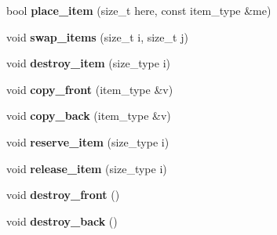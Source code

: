\begin{DoxyCompactItemize}
\item 
\hypertarget{classinternal_1_1item__buffer_a359f7e1708916af78e02bd3635dc5c6f}{}bool {\bfseries place\+\_\+item} (size\+\_\+t here, const item\+\_\+type \&me)\label{classinternal_1_1item__buffer_a359f7e1708916af78e02bd3635dc5c6f}

\item 
\hypertarget{classinternal_1_1item__buffer_ac4751d48bf1868349deda3a1de49ecba}{}void {\bfseries swap\+\_\+items} (size\+\_\+t i, size\+\_\+t j)\label{classinternal_1_1item__buffer_ac4751d48bf1868349deda3a1de49ecba}

\item 
\hypertarget{classinternal_1_1item__buffer_a170724771a4e56ad676d86439a916a3e}{}void {\bfseries destroy\+\_\+item} (size\+\_\+type i)\label{classinternal_1_1item__buffer_a170724771a4e56ad676d86439a916a3e}

\item 
\hypertarget{classinternal_1_1item__buffer_a08de719fb76466be302f42d07dcf2d28}{}void {\bfseries copy\+\_\+front} (item\+\_\+type \&v)\label{classinternal_1_1item__buffer_a08de719fb76466be302f42d07dcf2d28}

\item 
\hypertarget{classinternal_1_1item__buffer_a90f677f036f3eaa2324bc0b07ba804a1}{}void {\bfseries copy\+\_\+back} (item\+\_\+type \&v)\label{classinternal_1_1item__buffer_a90f677f036f3eaa2324bc0b07ba804a1}

\item 
\hypertarget{classinternal_1_1item__buffer_aa2a3fdd7c17bc37c60b1640802b23a80}{}void {\bfseries reserve\+\_\+item} (size\+\_\+type i)\label{classinternal_1_1item__buffer_aa2a3fdd7c17bc37c60b1640802b23a80}

\item 
\hypertarget{classinternal_1_1item__buffer_ab11d85b513ae349da499ee2ae6c63811}{}void {\bfseries release\+\_\+item} (size\+\_\+type i)\label{classinternal_1_1item__buffer_ab11d85b513ae349da499ee2ae6c63811}

\item 
\hypertarget{classinternal_1_1item__buffer_aea1592a817f8e18e76e9ce0a101504ba}{}void {\bfseries destroy\+\_\+front} ()\label{classinternal_1_1item__buffer_aea1592a817f8e18e76e9ce0a101504ba}

\item 
\hypertarget{classinternal_1_1item__buffer_ab7aa6605c707c6e2a3c7fd7c886dc81b}{}void {\bfseries destroy\+\_\+back} ()\label{classinternal_1_1item__buffer_ab7aa6605c707c6e2a3c7fd7c886dc81b}


\end{DoxyCompactItemize}

